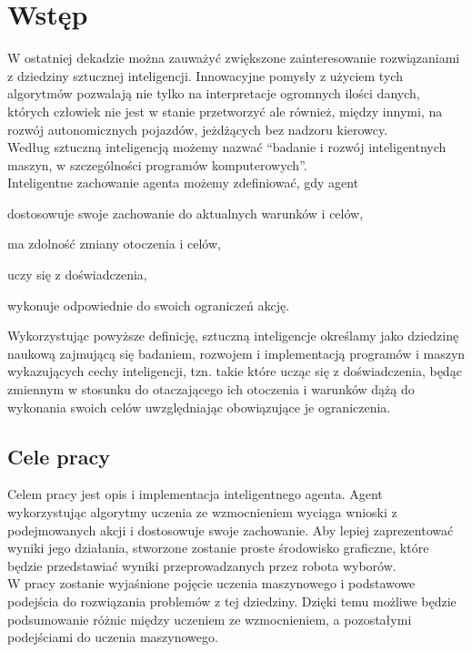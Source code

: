 \chapter{Wstęp}
\label{cha:wstep}

W ostatniej dekadzie można zauważyć zwiększone zainteresowanie rozwiązaniami z dziedziny
sztucznej inteligencji. Innowacyjne pomysły z użyciem tych algorytmów pozwalają nie tylko na interpretacje ogromnych 
ilości danych, których człowiek nie jest w stanie przetworzyć ale również, między innymi, na rozwój 
autonomicznych pojazdów, jeżdżących bez nadzoru kierowcy.\\
Według \cite{mccarthy2007artificial} sztuczną inteligencją możemy nazwać ``badanie i rozwój inteligentnych maszyn, 
w szczególności programów komputerowych''.\\
Inteligentne zachowanie agenta możemy zdefiniować, gdy agent\cite{L.:2010:AIF:1809744}
\begin{itemize*}
 \item dostosowuje swoje zachowanie do aktualnych warunków i celów,
 \item ma zdolność zmiany otoczenia i celów,
 \item uczy się z doświadczenia,
 \item wykonuje odpowiednie do swoich ograniczeń akcję.
\end{itemize*}
Wykorzystując powyższe definicję, sztuczną inteligencje określamy jako dziedzinę naukową zajmującą się badaniem, 
rozwojem i implementacją programów i maszyn wykazujących cechy inteligencji, tzn. takie które ucząc się z 
doświadczenia, będąc zmiennym w stosunku do otaczającego ich otoczenia i warunków dążą do wykonania swoich celów 
uwzględniając obowiązujące je ograniczenia. 

\section{Cele pracy}
\label{sec:celePracy}

Celem pracy jest opis i implementacja inteligentnego agenta. Agent wykorzystując algorytmy uczenia ze wzmocnieniem 
wyciąga wnioski z podejmowanych akcji i dostosowuje swoje zachowanie. Aby lepiej zaprezentować wyniki jego działania,
stworzone zostanie proste środowisko graficzne, które będzie przedstawiać wyniki przeprowadzanych przez robota wyborów.
\\
W pracy zostanie wyjaśnione pojęcie uczenia maszynowego i podstawowe podejścia do rozwiązania problemów z tej dziedziny.
Dzięki temu możliwe będzie podsumowanie różnic między uczeniem ze wzmocnieniem, a pozostałymi podejściami do uczenia 
maszynowego.






